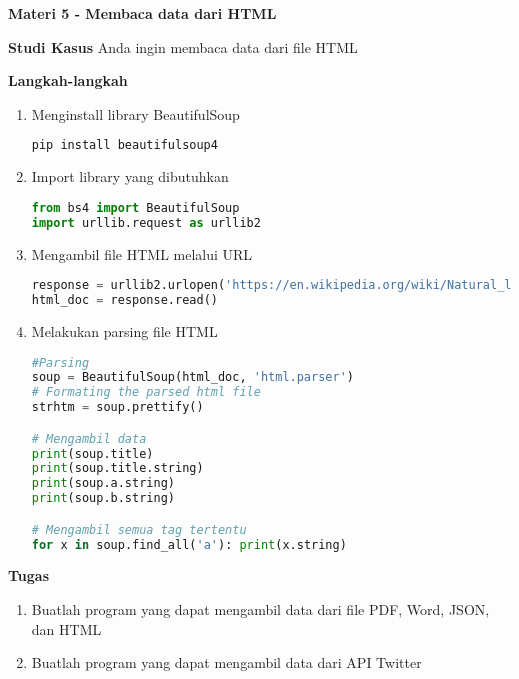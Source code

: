 \documentclass{article}
\begin{document}
    \begin{flushleft}
        \textbf{Materi 5 \@- Membaca data dari HTML}
        \newline

        \textbf{Studi Kasus}
        \newline
        Anda ingin membaca data dari file HTML
        \newline

        \textbf{Langkah-langkah}

        \begin{enumerate}
            \item Menginstall library BeautifulSoup
            \lstset{style=bashstyle}
            \begin{lstlisting}[language=bash]
pip install beautifulsoup4
            \end{lstlisting}

            \item Import library yang dibutuhkan
            \lstset{style=pythonstyle}
            \begin{lstlisting}[language=python]
from bs4 import BeautifulSoup   
import urllib.request as urllib2
            \end{lstlisting}

            \item Mengambil file HTML melalui URL
            \lstset{style=pythonstyle}
            \begin{lstlisting}[language=python]
response = urllib2.urlopen('https://en.wikipedia.org/wiki/Natural_language_processing')
html_doc = response.read()
            \end{lstlisting}

            \item Melakukan parsing file HTML
            \lstset{style=pythonstyle}
            \begin{lstlisting}[language=python]
#Parsing
soup = BeautifulSoup(html_doc, 'html.parser')
# Formating the parsed html file
strhtm = soup.prettify()

# Mengambil data
print(soup.title)
print(soup.title.string)
print(soup.a.string)
print(soup.b.string)

# Mengambil semua tag tertentu
for x in soup.find_all('a'): print(x.string)
            \end{lstlisting}
        \end{enumerate}
        
    \end{flushleft}

    \newpage
    \begin{flushleft}
        \textbf{Tugas}
        \newline

        \begin{enumerate}
            \item Buatlah program yang dapat mengambil data dari file PDF, Word, JSON, dan HTML
            \item Buatlah program yang dapat mengambil data dari API Twitter
        \end{enumerate}
    \end{flushleft}
\end{document}
